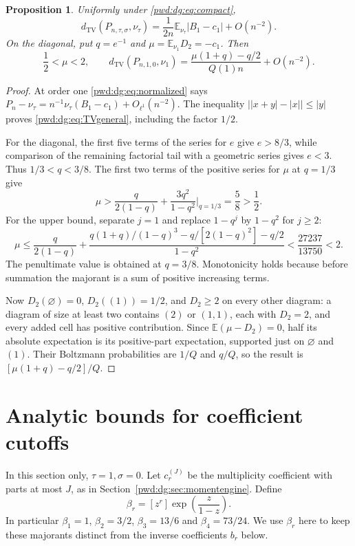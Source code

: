 \documentclass[11pt,letterpaper]{article}
\numberwithin{equation}{section}
\newtheorem{proposition}[theorem]{Proposition}
\theoremstyle{remark}\newtheorem{remark}[theorem]{Remark}
\newcommand{\E}{\mathbb E}\newcommand{\Prob}{\mathbb P}
\newcommand{\TV}{d_{\mathrm{TV}}}
\begin{document}
\begin{proposition}\label{pwd:dg:prop:TV}
Uniformly under \eqref{pwd:dg:eq:compact},
\begin{equation}\label{pwd:dg:eq:TVgeneral}
 \TV(P_{n,\tau,\sigma},\nu_\tau)
 =\frac1{2n}\E_{\nu_\tau}|B_1-c_1|+O(n^{-2}).
\end{equation}
On the diagonal, put $q=e^{-1}$ and $\mu=\E_{\nu_1}D_2=-c_1$. Then
\begin{equation}\label{pwd:dg:eq:TVdiag}
 \frac12<\mu<2,\qquad
 \TV(P_{n,1,0},\nu_1)
 =\frac{\mu(1+q)-q/2}{Q(1)n}+O(n^{-2}).
\end{equation}
\end{proposition}
\begin{proof}
At order one \eqref{pwd:dg:eq:normalized} says
$P_n-\nu_\tau=n^{-1}\nu_\tau(B_1-c_1)+O_{\ell^1}(n^{-2})$.
The inequality $\bigl||x+y|-|x|\bigr|\le|y|$ proves \eqref{pwd:dg:eq:TVgeneral}, including the factor $1/2$.

For the diagonal, the first five terms of the series for $e$ give $e>8/3$, while comparison of the remaining factorial tail with a geometric series gives $e<3$. Thus $1/3<q<3/8$. The first two terms of the positive series for $\mu$ at $q=1/3$ give
\[
 \mu>\frac{q}{2(1-q)}+\frac{3q^2}{1-q^2}\bigg|_{q=1/3}=\frac58>\frac12.
\]
For the upper bound, separate $j=1$ and replace $1-q^j$ by $1-q^2$ for $j\ge2$:
\begin{equation}\label{pwd:dg:eq:muupper}
 \mu\le\frac{q}{2(1-q)}+
 \frac{q(1+q)/(1-q)^3-q/[2(1-q)^2]-q/2}{1-q^2}
 <\frac{27237}{13750}<2.
\end{equation}
The penultimate value is obtained at $q=3/8$. Monotonicity holds because before summation the majorant is a sum of positive increasing terms.

Now $D_2(\varnothing)=0$, $D_2((1))=1/2$, and $D_2\ge2$ on every other diagram: a diagram of size at least two contains $(2)$ or $(1,1)$, each with $D_2=2$, and every added cell has positive contribution. Since $\E(\mu-D_2)=0$, half its absolute expectation is its positive-part expectation, supported just on $\varnothing$ and $(1)$. Their Boltzmann probabilities are $1/Q$ and $q/Q$, so the result is $[\mu(1+q)-q/2]/Q$.
\end{proof}

\section{Analytic bounds for coefficient cutoffs}\label{pwd:dg:sec:cutoff}
In this section only, $\tau=1,\sigma=0$. Let $c_r^{(J)}$ be the multiplicity coefficient with parts at most $J$, as in Section~\ref{pwd:dg:sec:momentengine}. Define
\begin{equation}\label{pwd:dg:eq:beta}
 \beta_r=[z^r]\exp\left(\frac{z}{1-z}\right).
\end{equation}
In particular $\beta_1=1$, $\beta_2=3/2$, $\beta_3=13/6$ and $\beta_4=73/24$. We use $\beta_r$ here to keep these majorants distinct from the inverse coefficients $b_r$ below.
\end{document}
